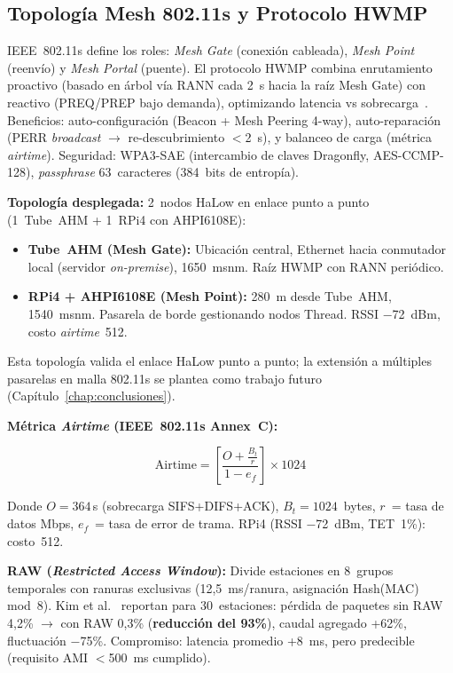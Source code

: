 \subsection{Topología Mesh 802.11s y Protocolo HWMP}
\label{sec:gateway-halow-mesh}

IEEE~802.11s define los roles: \emph{Mesh Gate} (conexión cableada), \emph{Mesh Point} (reenvío) y \emph{Mesh Portal} (puente).  El protocolo HWMP combina enrutamiento proactivo (basado en árbol vía RANN cada 2~s hacia la raíz Mesh Gate) con reactivo (PREQ/PREP bajo demanda), optimizando latencia vs sobrecarga~\cite{qiaoSurveyWiFiHaLow2018}.  Beneficios: auto-configuración (Beacon + Mesh Peering 4-way), auto-reparación (PERR \emph{broadcast} $\rightarrow$ re-descubrimiento $<$2~s), y balanceo de carga (métrica \emph{airtime}).  Seguridad: WPA3-SAE (intercambio de claves Dragonfly, AES-CCMP-128), \emph{passphrase} 63~caracteres (384~bits de entropía).



\textbf{Topología desplegada:} 2~nodos HaLow en enlace punto a punto (1~Tube~AHM + 1~RPi4 con AHPI6108E):

\begin{itemize}
    \item \textbf{Tube~AHM (Mesh Gate):} Ubicación central, Ethernet hacia conmutador local (servidor \emph{on-premise}), 1650~msnm.  Raíz HWMP con RANN periódico.
    \item \textbf{RPi4 + AHPI6108E (Mesh Point):} 280~m desde Tube~AHM, 1540~msnm.  Pasarela de borde gestionando nodos Thread.  RSSI $-$72~dBm, costo \emph{airtime}~512.
\end{itemize}

Esta topología valida el enlace HaLow punto a punto; la extensión a múltiples pasarelas en malla 802.11s se plantea como trabajo futuro (Capítulo~\ref{chap:conclusiones}).

\textbf{Métrica \emph{Airtime} (IEEE~802.11s Annex~C):}

\[
\text{Airtime} = \left[\frac{O + \frac{B_t}{r}}{1 - e_f}\right] \times 1024
\]

Donde $O = 364$\,\textmu s (sobrecarga SIFS+DIFS+ACK), $B_t = 1024$~bytes, $r$~= tasa de datos Mbps, $e_f$~= tasa de error de trama.  RPi4 (RSSI $-$72~dBm, TET~1\%): costo~512.

\textbf{RAW (\emph{Restricted Access Window}):} Divide estaciones en 8~grupos temporales con ranuras exclusivas (12,5~ms/ranura, asignación Hash(MAC) mod~8).  Kim et al.~\cite{kimIEEE80211ahHaLow2021} reportan para 30~estaciones: pérdida de paquetes sin RAW 4,2\% $\rightarrow$ con RAW 0,3\% (\textbf{reducción del 93\%}), caudal agregado +62\%, fluctuación $-$75\%.  Compromiso: latencia promedio +8~ms, pero predecible (requisito AMI $<$500~ms cumplido).

